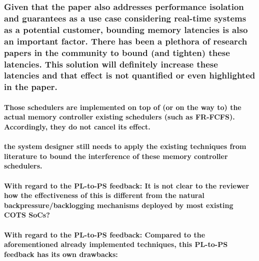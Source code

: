         \subsubsection{Given that the paper also addresses performance isolation and guarantees as a use case considering real-time systems as a potential customer, bounding memory latencies is also an important factor. There has been a plethora of research papers in the community to bound (and tighten) these latencies. This solution will definitely increase these latencies and that effect is not quantified or even highlighted in the paper.}

            \paragraph{Those schedulers are implemented on top of (or on the way to) the actual memory controller existing schedulers (such as FR-FCFS). Accordingly, they do not cancel its effect.}

            \paragraph{the system designer still needs to apply the existing techniques from literature to bound the interference of these memory controller schedulers.}

            \paragraph{With regard to the PL-to-PS feedback: It is not clear to the reviewer how the effectiveness of this is different from the natural backpressure/backlogging mechanisms deployed by most existing COTS SoCs?}

            \paragraph{With regard to the PL-to-PS feedback: Compared to the aforementioned already implemented techniques, this PL-to-PS feedback has its own drawbacks:}
